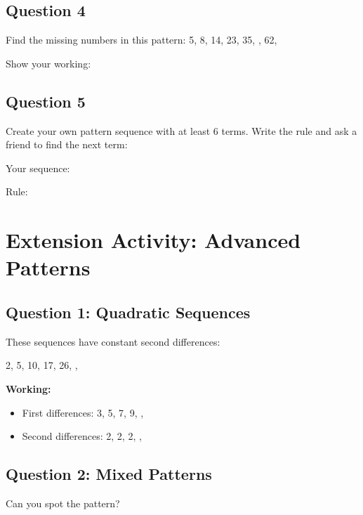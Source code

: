 \documentclass{article}
\begin{document}
\subsection*{Question 4}
Find the missing numbers in this pattern:
5, 8, 14, 23, 35, \underline{\hspace{1cm}}, 62, \underline{\hspace{1cm}}

Show your working:

\vspace{2cm}

\subsection*{Question 5}
Create your own pattern sequence with at least 6 terms. Write the rule and ask a friend to find the next term:

Your sequence: \underline{\hspace{8cm}}

Rule: \underline{\hspace{10cm}}

\section{Extension Activity: Advanced Patterns}

\subsection*{Question 1: Quadratic Sequences}
These sequences have constant second differences:

2, 5, 10, 17, 26, \underline{\hspace{1cm}}, \underline{\hspace{1cm}}

\textbf{Working:}
\begin{itemize}
    \item First differences: 3, 5, 7, 9, \underline{\hspace{1cm}}, \underline{\hspace{1cm}}
    \item Second differences: 2, 2, 2, \underline{\hspace{1cm}}, \underline{\hspace{1cm}}
\end{itemize}

\subsection*{Question 2: Mixed Patterns}
Can you spot the pattern?
\end{document}
